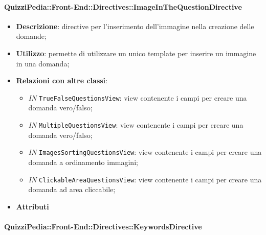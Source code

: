 \paragraph{QuizziPedia::Front-End::Directives::ImageInTheQuestionDirective}
\begin{itemize}
	\item \textbf{Descrizione}: directive per l'inserimento dell'immagine nella creazione delle domande;
	\item \textbf{Utilizzo}: permette di utilizzare un unico template per inserire un immagine in una domanda;
	\item \textbf{Relazioni con altre classi}:
	\begin{itemize}
		\item \textit{IN} \texttt{TrueFalseQuestionsView}: view contenente i campi per creare una domanda vero/falso; 
		\item \textit{IN} \texttt{MultipleQuestionsView}:  view contenente i campi per creare una domanda vero/falso; 
		\item \textit{IN} \texttt{ImagesSortingQuestionsView}: view contenente i campi per creare una domanda a ordinamento immagini;
		\item \textit{IN} \texttt{ClickableAreaQuestionsView}:  view contenente i campi per creare una domanda ad area cliccabile;
	\end{itemize}
	\item \textbf{Attributi}
\end{itemize}

\paragraph{QuizziPedia::Front-End::Directives::KeywordsDirective}
